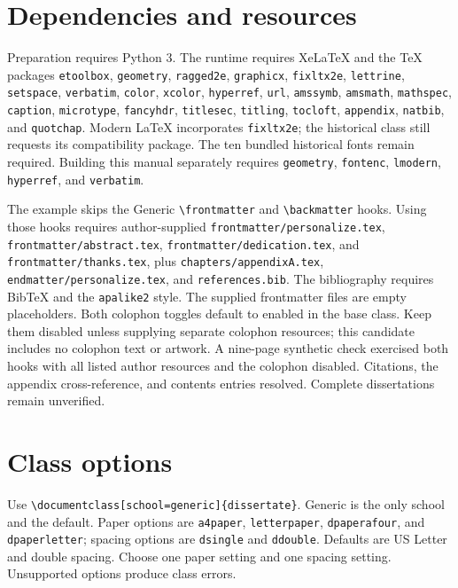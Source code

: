 \documentclass[10pt,letterpaper]{article}
\begin{document}
\section*{Dependencies and resources}
\begingroup\raggedright
Preparation requires Python 3. The runtime requires XeLaTeX and the TeX packages
\texttt{etoolbox}, \texttt{geometry}, \texttt{ragged2e}, \texttt{graphicx},
\texttt{fixltx2e}, \texttt{lettrine}, \texttt{setspace}, \texttt{verbatim},
\texttt{color}, \texttt{xcolor}, \texttt{hyperref}, \texttt{url},
\texttt{amssymb}, \texttt{amsmath}, \texttt{mathspec}, \texttt{caption},
\texttt{microtype}, \texttt{fancyhdr}, \texttt{titlesec}, \texttt{titling},
\texttt{tocloft}, \texttt{appendix}, \texttt{natbib}, and \texttt{quotchap}.
Modern LaTeX incorporates \texttt{fixltx2e}; the historical class still requests
its compatibility package. The ten bundled historical fonts remain required.
Building this manual separately requires \texttt{geometry}, \texttt{fontenc},
\texttt{lmodern}, \texttt{hyperref}, and \texttt{verbatim}.

The example skips the Generic \verb|\frontmatter| and \verb|\backmatter| hooks.
Using those hooks requires author-supplied \texttt{frontmatter/personalize.tex},
\texttt{frontmatter/abstract.tex}, \texttt{frontmatter/dedication.tex}, and
\texttt{frontmatter/thanks.tex}, plus \texttt{chapters/appendixA.tex}, \texttt{endmatter/personalize.tex},
and \texttt{references.bib}. The bibliography requires BibTeX and the
\texttt{apalike2} style. The supplied frontmatter files are empty placeholders.
Both colophon toggles default to enabled in the base class. Keep them disabled
unless supplying separate colophon resources; this candidate includes no
colophon text or artwork. A nine-page synthetic check exercised both hooks with all listed author resources and the colophon disabled. Citations, the appendix cross-reference, and contents entries resolved. Complete dissertations remain unverified.
\par\endgroup
\section*{Class options}
Use \verb|\documentclass[school=generic]{dissertate}|. Generic is the only school and the default. Paper options are \texttt{a4paper}, \texttt{letterpaper}, \texttt{dpaperafour}, and \texttt{dpaperletter}; spacing options are \texttt{dsingle} and \texttt{ddouble}. Defaults are US Letter and double spacing. Choose one paper setting and one spacing setting. Unsupported options produce class errors.
\newpage
\end{document}
